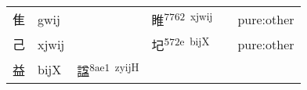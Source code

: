 \documentclass[14pt,a4paper]{scrartcl}
\begin{document}
\begin{longtable}[c]{@{}llllll@{}}
\begin{minipage}[t]{0.14\columnwidth}
隹
\strut\end{minipage} &
\begin{minipage}[t]{0.14\columnwidth}\raggedright\strut
gwij
\strut\end{minipage} &
\begin{minipage}[t]{0.14\columnwidth}\raggedright\strut
\strut\end{minipage} &
\begin{minipage}[t]{0.14\columnwidth}\raggedright\strut
睢\textsuperscript{7762~xjwij}
\strut\end{minipage} &
\begin{minipage}[t]{0.14\columnwidth}\raggedright\strut
\strut\end{minipage} &
\begin{minipage}[t]{0.14\columnwidth}\raggedright\strut
pure:other
\strut\end{minipage}\tabularnewline
\begin{minipage}[t]{0.14\columnwidth}\raggedright\strut
己
\strut\end{minipage} &
\begin{minipage}[t]{0.14\columnwidth}\raggedright\strut
xjwij
\strut\end{minipage} &
\begin{minipage}[t]{0.14\columnwidth}\raggedright\strut
\strut\end{minipage} &
\begin{minipage}[t]{0.14\columnwidth}\raggedright\strut
圮\textsuperscript{572e~bijX}
\strut\end{minipage} &
\begin{minipage}[t]{0.14\columnwidth}\raggedright\strut
\strut\end{minipage} &
\begin{minipage}[t]{0.14\columnwidth}\raggedright\strut
pure:other
\strut\end{minipage}\tabularnewline
\begin{minipage}[t]{0.14\columnwidth}\raggedright\strut
益
\strut\end{minipage} &
\begin{minipage}[t]{0.14\columnwidth}\raggedright\strut
bijX
\strut\end{minipage} &
\begin{minipage}[t]{0.14\columnwidth}\raggedright\strut
諡\textsuperscript{8ae1~zyijH}
\strut\end{minipage} &
\begin{minipage}[t]{0.14\columnwidth}\raggedright\strut
\strut\end{minipage} &

\end{longtable}
\end{document}
